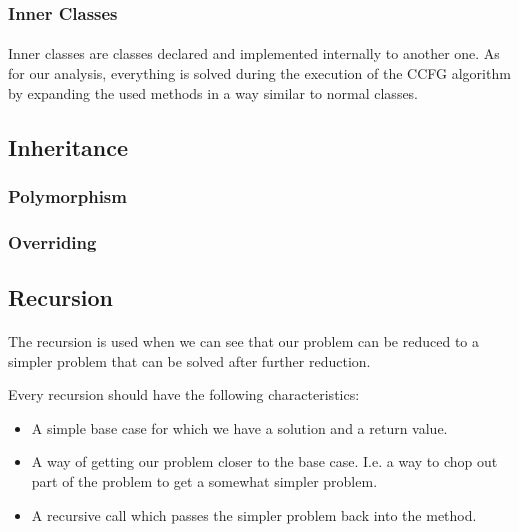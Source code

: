 \documentclass[letterpaper,twocolumn,10pt]{article}
\begin{document}
\subsubsection{Inner Classes} \paragraph{}
Inner classes are classes declared and implemented internally to another one. As for our analysis, everything is solved during the execution of the CCFG algorithm by expanding the used methods in a way similar to normal classes. 

\subsection{Inheritance} \paragraph{}
\subsubsection{Polymorphism} \paragraph{}
\subsubsection{Overriding} \paragraph{}

\subsection{Recursion}
\paragraph{}
The recursion is used when we can see that our problem can be reduced to a simpler problem that can be solved after further reduction.

Every recursion should have the following characteristics:

\begin{itemize}
\item A simple base case for which we have a solution and a return value.
\item A way of getting our problem closer to the base case. I.e. a way to chop out part of the problem to get a somewhat simpler problem.
\item A recursive call which passes the simpler problem back into the method. 
\end{itemize}
\end{document}
